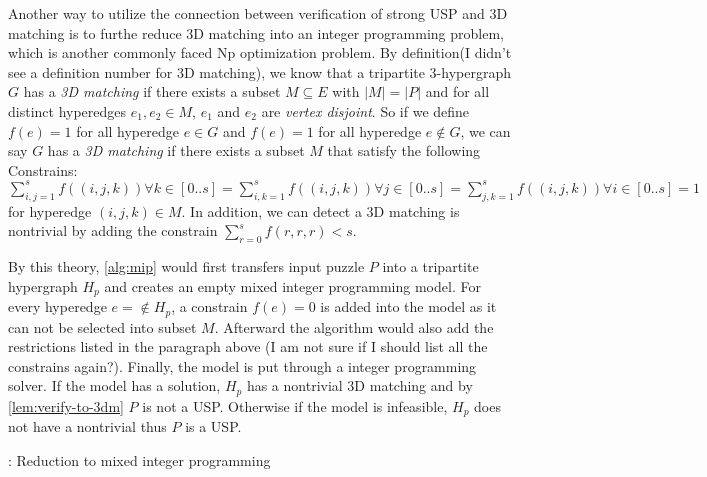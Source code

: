 \documentclass[11pt]{article}
\newcommand\sse{\subseteq}
\begin{document}
Another way to utilize the connection between verification of strong
USP and 3D matching is to furthe reduce 3D matching into an integer
programming problem, which is another commonly faced Np optimization
problem. By definition(I didn't see a definition number for 3D
matching), we know that a tripartite 3-hypergraph $G$ has a \emph{3D
  matching} if there exists a subset $M \sse E$ with $|M| = |P|$ and
for all distinct hyperedges $e_1, e_2 \in M$, $e_1$ and $e_2$ are
\emph{vertex disjoint}. So if we define $f(e) = 1$ for all hyperedge
$e \in G$ and $f(e) = 1$ for all hyperedge $e \notin G$, we can say
$G$ has a \emph{3D matching} if there exists a subset $M$ that satisfy
the following Constrains: $\sum_{i,j = 1}^{s} f((i,j,k)) \forall k \in
[0..s] = \sum_{i,k = 1}^{s} f((i,j,k)) \forall j \in [0..s] =
\sum_{j,k = 1}^{s} f((i,j,k))\forall i \in [0..s] = 1 $ for hyperedge
$(i,j,k) \in M$. In addition, we can detect a 3D matching is
nontrivial by adding the constrain $\sum_{r = 0}^{s} f(r,r,r) < s$.

By this theory, \autoref{alg:mip} would first transfers input puzzle
$P$ into a tripartite hypergraph $H_p$ and creates an empty mixed
integer programming model. For every hyperedge $e= \notin H_p$, a
constrain $f(e) = 0$ is added into the model as it can not be selected
into subset $M$. Afterward the algorithm would also add the
restrictions listed in the paragraph above (I am not sure if I should
list all the constrains again?). Finally, the model is put through a
integer programming solver. If the model has a solution, $H_p$ has a
nontrivial 3D matching and by \autoref{lem:verify-to-3dm} $P$ is not a
USP. Otherwise if the model is infeasible, $H_p$ does not have a
nontrivial thus $P$ is a USP.



\begin{algorithm}
  \caption{: Reduction to mixed integer programming}
  \label{alg:mip}
\begin{algorithmic}[1]
        \EndIf
      \EndFor
    \EndFor
  \EndFor
  \EndFor

  \Else
  \EndIf

  \EndFunction
\end{algorithmic}
\end{algorithm}
\end{document}

